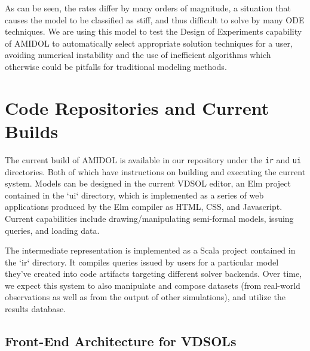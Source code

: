 \documentclass[11pt]{article}
\newcommand{\amidol}{\textsc{AMIDOL}}
\begin{document}
As can be seen, the rates differ by many orders of magnitude, a situation that causes the model to be classified as stiff, and thus difficult to solve by many ODE techniques.  We are using this model to test the Design of Experiments capability of \amidol{} to automatically select appropriate solution techniques for a user, avoiding numerical instability and the use of inefficient algorithms which otherwise could be pitfalls for traditional modeling methods.

\section{Code Repositories and Current Builds}

The current build of \amidol{} is available in our repository under the \texttt{ir} and \texttt{ui} directories.  Both of which have instructions on building and executing the current system.  Models can be designed in the current VDSOL editor, an Elm project contained in the `ui` directory, which is implemented as a series of
web applications produced by the Elm compiler as HTML, CSS, and Javascript. Current capabilities include drawing/manipulating semi-formal models, issuing queries, and loading data.

The intermediate representation is implemented as a Scala project contained in the `ir` directory.  It compiles queries issued by users for a particular model they've created into code artifacts targeting different solver backends. Over time, we expect this
system to also manipulate and compose datasets (from real-world observations
as well as from the output of other simulations), and utilize the results database.


\subsection{Front-End Architecture for VDSOLs}
\end{document}
